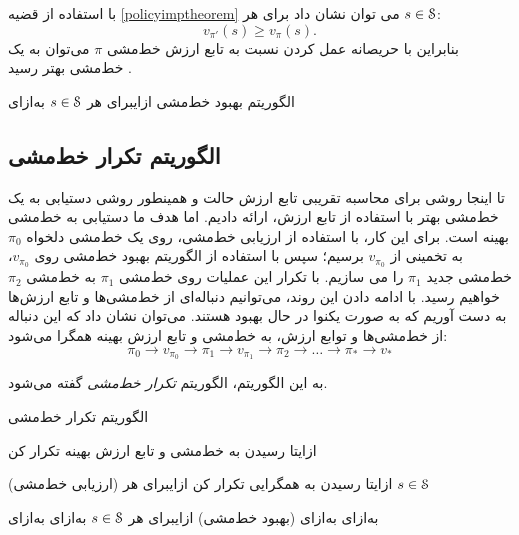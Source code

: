 با استفاده از قضیه \ref{policyimptheorem} می توان نشان داد برای هر
$s \in \EuScript{S}$:
$$v_{\pi'}(s) \ge v_{\pi}(s).$$
بنابراین با حریصانه عمل کردن نسبت به تابع ارزش خط‌مشی $\pi$ می‌توان به یک خط‌مشی بهتر رسید \cite{suttonbook}.


{الگوریتم بهبود خط‌مشی \cite{suttonbook}}
‌ازای{برای هر $s \in \EuScript{S}$}
‌به‌ازای

\subsection{الگوریتم تکرار خط‌مشی}
تا اینجا روشی برای محاسبه تقریبی تابع ارزش حالت و همینطور روشی دستیابی به یک خط‌مشی بهتر با استفاده از تابع ارزش، ارائه دادیم. اما هدف ما دستیابی به خط‌مشی بهینه است. 
برای این کار، با استفاده از ارزیابی خط‌مشی، روی یک خط‌مشی دلخواه $\pi_0$ به تخمینی از 
$v_{\pi_0}$
 برسیم؛ سپس با استفاده از الگوریتم بهبود خط‌مشی روی 
$v_{\pi_0}$،
خط‌مشی جدید 
$\pi_1$
را می سازیم. با تکرار این عملیات روی خط‌مشی 
$\pi_1$
به خط‌مشی 
$\pi_2$
خواهیم رسید. با ادامه دادن این روند، می‌توانیم دنباله‌ای از خط‌مشی‌ها و تابع ارزش‌ها به دست آوریم که به صورت یکنوا در حال بهبود هستند. می‌توان نشان داد که این دنباله از خط‌مشی‌ها و توابع ارزش، به خط‌مشی و تابع ارزش بهینه همگرا می‌شود:
$$\pi_0 \longrightarrow v_{\pi_0} \longrightarrow \pi_1 \longrightarrow v_{\pi_1} \longrightarrow \pi_2 \longrightarrow \dots \longrightarrow \pi_* \longrightarrow v_*$$

به این الگوریتم، الگوریتم \textit{تکرار خط‌مشی}  
گفته می‌شود.

{الگوریتم تکرار خط‌مشی \cite{suttonbook}}

‌ازای{تا رسیدن به خط‌مشی و تابع ارزش بهینه تکرار کن}

(ارزیابی خط‌مشی)
‌ازای{تا رسیدن به همگرایی تکرار کن}
‌ازای{برای هر $s \in \EuScript{S}$}

‌به‌ازای
‌به‌ازای
(بهبود خط‌مشی)
‌ازای{برای هر $s \in \EuScript{S}$}
‌به‌ازای
‌به‌ازای


